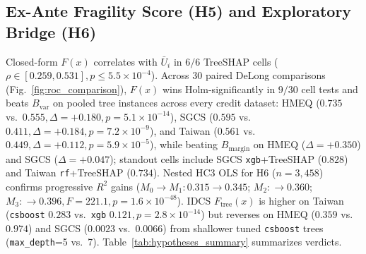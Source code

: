 \documentclass[conference]{IEEEtran}
\begin{document}
\subsection{Ex-Ante Fragility Score (H5) and Exploratory Bridge (H6)}
\label{sec:res_h5h6}
Closed-form $F(x)$ correlates with $\bar{U}_i$ in $6/6$ TreeSHAP cells ($\rho\in[0.259,0.531], p\le 5.5{\times}10^{-4}$). Across 30 paired DeLong comparisons (Fig.~\ref{fig:roc_comparison}), $F(x)$ wins Holm-significantly in $9/30$ cell tests and beats $B_{\mathrm{var}}$ on pooled tree instances across every credit dataset: HMEQ ($0.735$ vs.\ $0.555, \Delta{=}{+}0.180, p{=}5.1{\times}10^{-14}$), SGCS ($0.595$ vs.\ $0.411, \Delta{=}{+}0.184, p{=}7.2{\times}10^{-9}$), and Taiwan ($0.561$ vs.\ $0.449, \Delta{=}{+}0.112, p{=}5.9{\times}10^{-5}$), while beating $B_{\mathrm{margin}}$ on HMEQ ($\Delta{=}{+}0.350$) and SGCS ($\Delta{=}{+}0.047$); standout cells include SGCS \texttt{xgb}+TreeSHAP ($0.828$) and Taiwan \texttt{rf}+TreeSHAP ($0.734$). Nested HC3 OLS for H6 ($n{=}3{,}458$) confirms progressive $R^2$ gains ($M_0{\to}M_1: 0.315{\to}0.345$; $M_2: {\to}0.360$; $M_3: {\to}0.396, F{=}221.1, p{=}1.6{\times}10^{-48}$). IDCS $F_{\mathrm{tree}}(x)$ is higher on Taiwan (\texttt{csboost} $0.283$ vs.\ \texttt{xgb} $0.121, p{=}2.8{\times}10^{-14}$) but reverses on HMEQ ($0.359$ vs.\ $0.974$) and SGCS ($0.0023$ vs.\ $0.0066$) from shallower tuned \texttt{csboost} trees (\texttt{max\_depth}=5 vs.\ 7). Table~\ref{tab:hypotheses_summary} summarizes verdicts.
\end{document}
